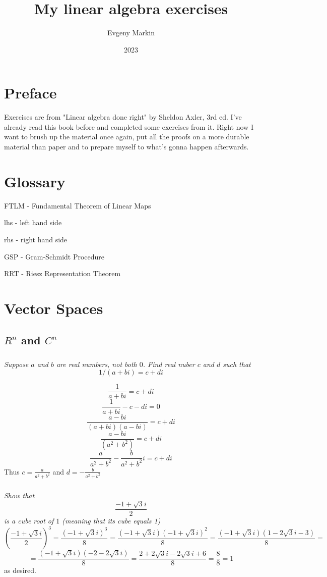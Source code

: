 \documentclass[11pt,oneside,titlepage]{book}
\title{My linear algebra exercises}
\author{Evgeny Markin}
\date{2023}
\begin{document}
\maketitle
\tableofcontents

\chapter*{Preface}

Exercises are from "Linear algebra done right" by Sheldon Axler, 3rd ed.
I've already read this book before and completed some exercises from it.
Right now I want to brush up the material once again, put all the
proofs on a more durable material than paper and to prepare myself to
what's gonna happen afterwards.

\chapter*{Glossary}

FTLM - Fundamental Theorem of Linear Maps

lhs - left hand side

rhs - right hand side

GSP - Gram-Schmidt Procedure

RRT - Riesz Representation Theorem

\chapter{Vector Spaces}
\section{$R^n$ and $C^n$}

\subsection{}
\textit{Suppose $a$ and $b$ are real numbers, not both $0$. Find real nuber
  $c$ and $d$ such that }
$$1/(a + bi) = c + di$$

$$\frac{1}{a + bi} = c + di$$
$$\frac{1}{a + bi} - c - di = 0$$
$$\frac{a - bi}{(a + bi)(a - bi)} = c + di$$
$$\frac{a - bi}{(a^2 + b^2)} = c + di$$
$$\frac{a}{a^2 + b^2} - \frac{b}{a^2 + b^2}i = c + di$$
Thus $c = \frac{a}{a^2 + b^2}$ and $d = -\frac{b}{a^2 + b^2}$

\subsection{}
\textit{Show that }
$$\frac{-1  + \sqrt{3}i}{2}$$
\textit{is a cube root of $1$ (meaning that its cube equals 1)}
$$(\frac{-1  + \sqrt{3}i}{2})^3 =
\frac{(-1  + \sqrt{3}i)^3}{8} =
\frac{(-1  + \sqrt{3}i)(-1  + \sqrt{3}i)^2}{8} =
\frac{(-1  + \sqrt{3}i)(1  - 2\sqrt{3}i - 3)}{8} =
$$
$$
=\frac{(-1  + \sqrt{3}i)(-2  - 2\sqrt{3}i)}{8} =
\frac{2 + 2\sqrt{3}i - 2\sqrt{3}i + 6}{8} =
\frac{8}{8} = 1
$$
as desired.
\end{document}
